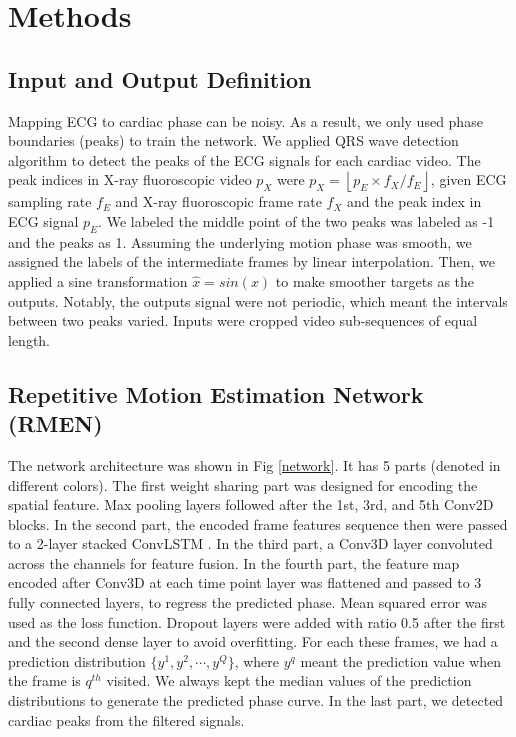 \documentclass{article}
\begin{document}
\section{Methods}
\subsection{Input and Output Definition}
Mapping ECG to cardiac phase can be noisy. As a result, we only used phase boundaries (peaks) to train the network. We applied QRS wave detection algorithm \cite{ecgtool} to detect the peaks of the ECG signals for each cardiac video. The peak indices in X-ray fluoroscopic video $p_{X}$ were $p_{X} = \left\lfloor p_{E}\times f_{X}/{f_{E}}\right\rfloor$, given ECG sampling rate $f_{E}$ and X-ray fluoroscopic frame rate $f_{X}$ and the peak index in ECG signal $p_{E}$. We labeled the middle point of the two peaks was labeled as -1 and the peaks as 1. Assuming the underlying motion phase was smooth, we assigned the labels of the intermediate frames by linear interpolation. Then, we applied a sine transformation $\hat{x} = sin(x)$ to make smoother targets \cite{hinton2015distilling} as the outputs. Notably, the outputs signal were not periodic, which meant the intervals between two peaks varied. Inputs were cropped video sub-sequences of equal length.

\subsection{Repetitive Motion Estimation Network (RMEN) }
\label{netmethod}
The network architecture was shown in Fig \ref{network}. It has 5 parts (denoted in different colors).   The first weight sharing part was designed for encoding the spatial feature. Max pooling layers followed after the 1st, 3rd, and 5th Conv2D blocks. In the second part, the encoded frame features sequence then were passed to a 2-layer stacked ConvLSTM \cite{xingjian2015convolutional}. In the third part, a Conv3D layer convoluted across the channels for feature fusion. In the fourth part, the feature map encoded after Conv3D at each time point layer was flattened and passed to 3 fully connected layers, to regress the predicted phase. Mean squared error was used as the loss function. Dropout layers were added with ratio 0.5 after the first and the second dense layer to avoid overfitting. For each these frames, we had a prediction distribution $\{y^1,y^2,\cdots,y^Q\}$, where $y^q$ meant the prediction value when the frame is $q^{th}$ visited. We always kept the median values of the prediction distributions to generate the predicted phase curve. In the last part, we detected cardiac peaks from the filtered signals.
\end{document}
